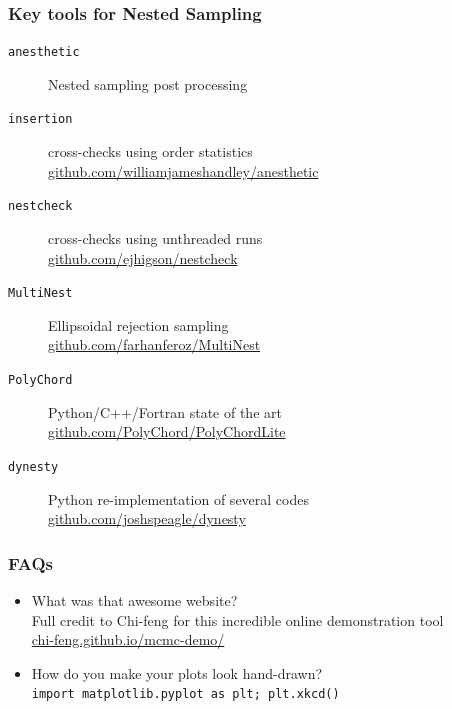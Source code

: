 \documentclass[aspectratio=169]{beamer}
\begin{document}
\begin{frame}
    \frametitle{Key tools for Nested Sampling}
    \begin{description}
        \item[\texttt{anesthetic}] Nested sampling post processing \\
        \item[\texttt{insertion}] cross-checks using order statistics 
            \hspace{5pt}\url{github.com/williamjameshandley/anesthetic}
        \item[\texttt{nestcheck}] cross-checks using unthreaded runs \\
            \hspace{5pt}\url{github.com/ejhigson/nestcheck}
        \item[\texttt{MultiNest}] Ellipsoidal rejection sampling \\
            \hspace{5pt}\url{github.com/farhanferoz/MultiNest}
        \item[\texttt{PolyChord}] Python/C++/Fortran state of the art \\
            \hspace{5pt}\url{github.com/PolyChord/PolyChordLite} 
        \item[\texttt{dynesty}] Python re-implementation of several codes \\
            \hspace{5pt}\url{github.com/joshspeagle/dynesty}
    \end{description}
\end{frame}



\begin{frame}
    \frametitle{FAQs}
    
    \begin{itemize}
    \item What was that awesome website? \\
    \hfill Full credit to Chi-feng for this incredible online demonstration tool\\
    \hfill \href{https://chi-feng.github.io/mcmc-demo/}{chi-feng.github.io/mcmc-demo/}

    \item How do you make your plots look hand-drawn? \\
        \hfill \texttt{import matplotlib.pyplot as plt; plt.xkcd()}
    \end{itemize}
\end{frame}
\end{document}
